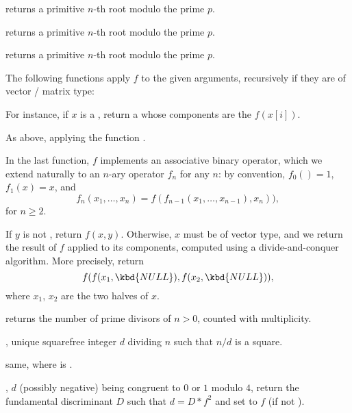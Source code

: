  returns a primitive $n$-th root modulo
the prime $p$.

 returns a primitive $n$-th root modulo
the prime $p$.

 returns a primitive $n$-th root
modulo the prime $p$.


The following functions apply $f$ to the given arguments, recursively
if they are of vector / matrix type:

 For instance, if $x$ is a
, return a  whose components are the $f(x[i])$.

 As above, applying the
function .



In the last function, $f$ implements an associative binary operator, which we
extend naturally to an $n$-ary operator $f_n$ for any $n$: by convention,
$f_0() = 1$, $f_1(x) = x$, and
$$ f_n(x_1,\dots,x_n) = f( f_{n-1}(x_1,\dots,x_{n-1}), x_n)),$$
for $n \geq 2$.

 If $y$ is not
, return $f(x,y)$. Otherwise, $x$ must be of vector type, and we
return the result of $f$ applied to its components, computed using a
divide-and-conquer algorithm. More precisely, return
$$f( f(x_1,\kbd{NULL}), f(x_2,\kbd{NULL}) ),$$
where $x_1$, $x_2$ are the two halves of $x$.


 returns the number of prime divisors of $n >
0$, counted with multiplicity.

, unique squarefree integer $d$ dividing $n$ such
that $n/d$ is a square.

 same, where  is .

, $d$ (possibly negative)
being congruent to $0$ or $1$ modulo $4$, return the fundamental
discriminant $D$ such that $d=D*f^2$ and set  to $f$
(if  not ).

